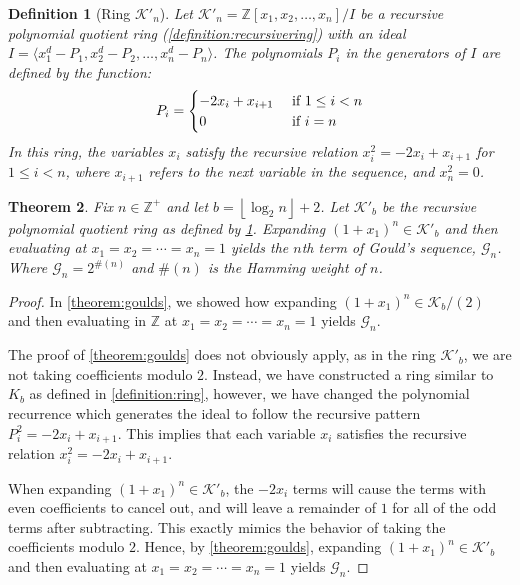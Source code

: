 \documentclass[12pt,reqno]{article}
\theoremstyle{plain}
\newtheorem{theorem}{Theorem}
\newtheorem{definition}[theorem]{Definition}
\newcommand{\floor}[1]{\left\lfloor #1 \right\rfloor}
\newcommand{\Z}{\mathbb{Z}}
\newcommand{\K}{\mathcal{K}}
\newcommand{\Ki}{\mathcal{K}'}
\newcommand{\wt}[1]{\#(#1)}
\newcommand{\Goulds}{\mathcal{G}}
\begin{document}
\begin{definition}[Ring $\Ki_n$] \label{definition:ring2}
Let $\Ki_n = \Z[x_1, x_2, \ldots, x_n]/I$ be a recursive polynomial quotient ring (\cref{definition:recursivering}) with an ideal $I = \langle x_1^d - P_1, x_2^d - P_2, \ldots, x_n^d - P_n \rangle$. The polynomials $P_i$ in the generators of $I$ are defined by the function:
\begin{displaymath}
P_i =
\begin{cases}
    -2x_i + x_{i+1} & \textup{ if } 1 \leq i < n \\
    0 &\textup{ if } i = n
\end{cases}
\end{displaymath}
In this ring, the variables $x_i$ satisfy the recursive relation $x_i^2 = -2x_i + x_{i+1}$ for $1 \leq i < n$, where $x_{i+1}$ refers to the next variable in the sequence, and $x_n^2 = 0$.
\end{definition}

\begin{theorem} \label{theorem:goulds2}
Fix $n \in \Z^+$ and let $b={\floor{\log_2 n}+2}$. Let $\Ki_b$ be the recursive polynomial quotient ring as defined by \cref{definition:ring2}. Expanding $(1+x_1)^n \in \Ki_b$ and then evaluating at $x_1=x_2=\cdots=x_n=1$ yields the $n$th term of Gould's sequence, $\Goulds_n$. Where $\Goulds_n = 2^{\wt{n}}$ and $\wt{n}$ is the Hamming weight of $n$.
\end{theorem}
\begin{proof}
In \cref{theorem:goulds}, we showed how expanding $(1+x_1)^n \in \K_b/(2)$ and then evaluating in $\Z$ at $x_1=x_2=\cdots=x_n=1$ yields $\Goulds_n$.

The proof of \cref{theorem:goulds} does not obviously apply, as in the ring $\Ki_b$, we are not taking coefficients modulo $2$. Instead, we have constructed a ring similar to $K_b$ as defined in \cref{definition:ring}, however, we have changed the polynomial recurrence which generates the ideal to follow the recursive pattern $P_{i}^2 = -2 x_i + x_{i+1}$. This implies that each variable $x_i$ satisfies the recursive relation $x_i^2 = -2x_i + x_{i+1}$.

When expanding $(1+x_1)^n \in \Ki_b$, the $-2x_i$ terms will cause the terms with even coefficients to cancel out, and will leave a remainder of $1$ for all of the odd terms after subtracting. This exactly mimics the behavior of taking the coefficients modulo $2$. Hence, by \cref{theorem:goulds}, expanding $(1+x_1)^n \in \Ki_b$ and then evaluating at $x_1=x_2=\cdots=x_n=1$ yields $\Goulds_n$.
\end{proof}
\end{document}
